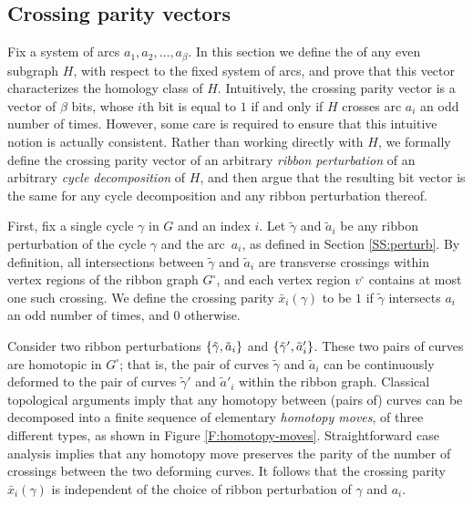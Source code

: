 \documentclass[letterpaper,review]{siamart190516}
\begin{document}
\subsection{Crossing parity vectors}

Fix a system of arcs $a_1, a_2, \dots, a_\beta$.  In this section we define the  of any even subgraph $H$, with respect to the fixed system of arcs, and prove that this vector characterizes the homology class of $H$.  Intuitively, the crossing parity vector is a vector of $\beta$ bits, whose $i$th bit is equal to $1$ if and only if $H$ crosses arc $a_i$ an odd number of times.  However, some care is required to ensure that this intuitive notion is actually consistent.  Rather than working directly with $H$, we formally define the crossing parity vector of an arbitrary \emph{ribbon perturbation} of an arbitrary \emph{cycle decomposition} of $H$, and then argue that the resulting bit vector is the same for any cycle decomposition and any ribbon perturbation thereof.

First, fix a single cycle $\gamma$ in $G$ and an index $i$.  Let $\tilde{\gamma}$ and $\tilde{a}_i$ be any ribbon perturbation of the cycle $\gamma$ and the arc~$a_i$, as defined in Section \ref{SS:perturb}.  By definition, all intersections between $\tilde\gamma$ and $\tilde{a}_i$ are transverse crossings within vertex regions of the ribbon graph $G^\square$, and each vertex region $v^\square$ contains at most one such crossing.  We define the crossing parity $\bar{x}_i(\gamma)$ to be $1$ if $\tilde\gamma$ intersects $a_i$ an odd number of times, and $0$ otherwise.

Consider two ribbon perturbations $\{ \tilde{\gamma}, \tilde{a}_i \}$ and $\{ \tilde{\gamma}', \tilde{a}'_i \}$.  These two pairs of curves are homotopic in $G^\square$; that is, the pair of curves $\tilde{\gamma}$ and $\tilde{a}_i$ can be continuously deformed to the pair of curves $\tilde{\gamma}'$ and $\tilde{a}'_i$ within the ribbon graph.  Classical topological arguments \cite{a-cas-26,ab-tkc-26,r-ebk-27} imply that any homotopy between (pairs of) curves can be decomposed into a finite sequence of elementary \emph{homotopy moves}, of three different types, as shown in Figure \ref{F:homotopy-moves}.  Straightforward case analysis implies that any homotopy move preserves the parity of the number of crossings between the two deforming curves.
It follows that the crossing parity $\bar{x}_i(\gamma)$ is independent of the choice of ribbon perturbation of $\gamma$ and $a_i$.
\end{document}
